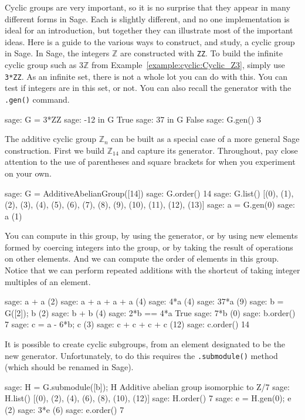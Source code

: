 Cyclic groups are very important, so it is no surprise that they appear in many different forms in Sage.  Each is slightly different, and no one implementation is ideal for an introduction, but together they can illustrate most of the important ideas.  Here is a guide to the various ways to construct, and study, a cyclic group in Sage.
%
%
In Sage, the integers $\mathbb Z$ are constructed with \verb?ZZ?.  To build the infinite cyclic group such as $3\mathbb Z$ from Example~\ref{example:cyclic:Cyclic_Z3}, simply use \verb?3*ZZ?.  As an infinite set, there is not a whole lot you can do with this.  You can test if integers are in this set, or not.  You can also recall the generator with the \verb?.gen()? command.
%
\begin{sageexample}
sage: G = 3*ZZ
sage: -12 in G
True
sage: 37 in G
False
sage: G.gen()
3
\end{sageexample}
%
%
The additive cyclic group $\mathbb Z_n$ can be built as a special case of a more general Sage construction.  First we build $\mathbb Z_{14}$ and capture its generator.  Throughout, pay close attention to the use of parentheses and square brackets for when you experiment on your own.
%
\begin{sageexample}
sage: G = AdditiveAbelianGroup([14])
sage: G.order()
14
sage: G.list()
[(0), (1), (2), (3), (4), (5), (6), (7),
 (8), (9), (10), (11), (12), (13)]
sage: a = G.gen(0)
sage: a
(1)
\end{sageexample}
%
You can compute in this group, by using the generator, or by using new elements formed by coercing integers into the group, or by taking the result of operations on other elements.  And we can compute the order of elements in this group.  Notice that we can perform repeated additions with the shortcut of taking integer multiples of an element.
%
\begin{sageexample}
sage: a + a
(2)
sage: a + a + a + a
(4)
sage: 4*a
(4)
sage: 37*a
(9)
sage: b = G([2]); b
(2)
sage: b + b
(4)
sage: 2*b == 4*a
True
sage: 7*b
(0)
sage: b.order()
7
sage: c = a - 6*b; c
(3)
sage: c + c + c + c
(12)
sage: c.order()
14
\end{sageexample}
%
It is possible to create cyclic subgroups, from an element designated to be the new generator.  Unfortunately, to do this requires the \verb?.submodule()? method (which should be renamed in Sage).
%
\begin{sageexample}
sage: H = G.submodule([b]); H
Additive abelian group isomorphic to Z/7
sage: H.list()
[(0), (2), (4), (6), (8), (10), (12)]
sage: H.order()
7
sage: e = H.gen(0); e
(2)
sage: 3*e
(6)
sage: e.order()
7
\end{sageexample}
